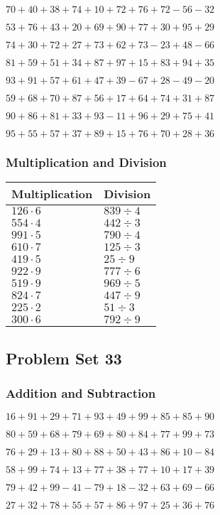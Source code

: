 \(70+40+38+74+10+72+76+72-56-32\)

\(53+76+43+20+69+90+77+30+95+29\)

\(74+30+72+27+73+62+73-23+48-66\)

\(81+59+51+34+87+97+15+83+94+35\)

\(93+91+57+61+47+39-67+28-49-20\)

\(59+68+70+87+56+17+64+74+31+87\)

\(90+86+81+33+93-11+96+29+75+41\)

\(95+55+57+37+89+15+76+70+28+36\)

\hypertarget{multiplication-and-division-31}{%
\subsubsection{Multiplication and
Division}\label{multiplication-and-division-31}}

\begin{longtable}[]{@{}ll@{}}
\toprule
Multiplication & Division\tabularnewline
\midrule
\endhead
\(126\cdot6\) & \(839÷4\)\tabularnewline
\(554\cdot4\) & \(442÷3\)\tabularnewline
\(991\cdot5\) & \(790÷4\)\tabularnewline
\(610\cdot7\) & \(125÷3\)\tabularnewline
\(419\cdot5\) & \(25÷9\)\tabularnewline
\(922\cdot9\) & \(777÷6\)\tabularnewline
\(519\cdot9\) & \(969÷5\)\tabularnewline
\(824\cdot7\) & \(447÷9\)\tabularnewline
\(225\cdot2\) & \(51÷3\)\tabularnewline
\(300\cdot6\) & \(792÷9\)\tabularnewline
\bottomrule
\end{longtable}

\hypertarget{problem-set-33}{%
\subsection{Problem Set 33}\label{problem-set-33}}

\hypertarget{addition-and-subtraction-32}{%
\subsubsection{Addition and
Subtraction}\label{addition-and-subtraction-32}}

\(16+91+29+71+93+49+99+85+85+90\)

\(80+59+68+79+69+80+84+77+99+73\)

\(76+29+13+80+88+50+43+86+10-84\)

\(58+99+74+13+77+38+77+10+17+39\)

\(79+42+99-41-79+18-32+63+69-66\)

\(27+32+78+55+57+86+97+25+36+76\)

